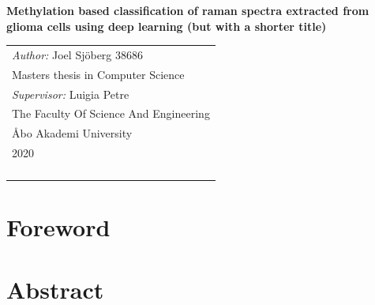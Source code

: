\documentclass[a4paper, 12pt, oneside]{book}
\begin{document}
\pagestyle{empty}    
\begingroup
{}


\begin{titlepage}
\vspace*{144pt}
\begin{center}
\Huge\bf Methylation based classification of raman spectra extracted from glioma cells using deep learning (but with a shorter title) %


\end{center}
\enlargethispage{3cm}
\vfill

\hfill
\begin{tabular}[t]{l@{}}%
\textit{Author:} Joel Sjöberg 38686\\ %
Masters thesis in Computer Science\\ %
\textit{Supervisor:} Luigia Petre\\ %
The Faculty Of Science And Engineering\\ %
Åbo Akademi University\\ 
2020\\ %
\\
\\
\\
\\
\end{tabular}
\end{titlepage}


\tableofcontents 


\endgroup %

\clearpage
\pagestyle{plain}      
\chapter*{Foreword}


\chapter*{Abstract}

\end{document}
